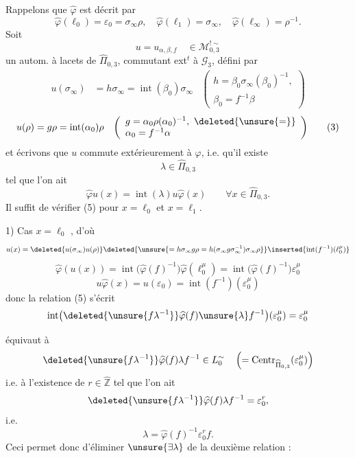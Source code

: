 Rappelons  que $\widehat\varphi$ est décrit par
\[
\widehat\varphi(\ell_0)=\varepsilon_0=\sigma_\infty\rho,\quad
\widehat\varphi(\ell_1)=\sigma_\infty,\quad
\widehat\varphi(\ell_\infty)=\rho^{-1}.
\tag{1}
\]
Soit
\[
u=u_{\alpha,\beta,f}\quad\in\mathcal M_{0,3}^{!\sim}
\]
un autom. à lacets de $\widehat\Pi_{0,3}$, commutant ext${}^{t}$ à $\mathcal G_3$, défini par
\[
\begin{aligned}
u(\sigma_\infty)&=h\sigma_\infty=\operatorname{int}(\beta_0)\sigma_\infty
&\left(\begin{array}{l}h=\beta_0\sigma_\infty(\beta_0)^{-1},\\\beta_0=f^{-1}\beta\end{array}\right)
\end{aligned}
\tag{2}
\]
\[
\begin{aligned}
u(\rho)&=g\rho=\operatorname{int}(\alpha_0)\rho
&\left(\begin{array}{l}g=\alpha_0\rho(\alpha_0)^{-1},\ \deleted{\unsure{=}}\\\alpha_0=f^{-1}\alpha\end{array}\right)
\end{aligned}
\tag{3}
\]
et écrivons que $u$ commute extérieurement à $\varphi$, i.e. qu'il existe \deleted{\unsure{$\lambda\in$}}
\[
\lambda\in\widehat\Pi_{0,3}
\tag{4}
\]
tel que l'on ait
\[
\widehat\varphi u(x)=\operatorname{int}(\lambda)u\widehat\varphi(x)
\qquad\forall x\in\widehat\Pi_{0,3}.
\tag{5}
\]
Il suffit de vérifier (5) pour $x=\ell_0$ et $x=\ell_1$.

1) Cas $x=\ell_0$ , d'où
\[
u(x)=\deleted{u(\sigma_\infty)u(\rho)}\deleted{\unsure{=h\sigma_\infty g\rho=h(\sigma_\infty g\sigma_\infty^{-1})\sigma_\infty\rho}}
\inserted{\operatorname{int}(f^{-1})(\ell_0^\mu)}
\]
\[
\widehat\varphi(u(x))=\operatorname{int}\bigl(\widehat\varphi(f)^{-1}\bigr)\widehat\varphi(\ell_0^\mu)=\operatorname{int}\bigl(\widehat\varphi(f)^{-1}\bigr)\varepsilon_0^\mu
\]
\[
u\widehat\varphi(x)=u(\varepsilon_0)=\operatorname{int}(f^{-1})(\varepsilon_0^\mu)
\]
donc la relation (5) s'écrit
\[
\operatorname{int}\bigl(\deleted{\unsure{f\lambda^{-1}}}\widehat\varphi(f)\unsure{\lambda}f^{-1}\bigr)(\varepsilon_0^\mu)=\varepsilon_0^\mu
\]

équivaut à
\[
\deleted{\unsure{f\lambda^{-1}}}\widehat\varphi(f)\lambda f^{-1}\in L_0^{\sim}\quad
\left(=\operatorname{Centr}_{\widehat\Pi_{0,3}}(\varepsilon_0^\mu)\right)
\]
i.e. à l'existence de $r\in\widehat{\mathbb Z}$ tel que l'on ait
\[
\deleted{\unsure{f\lambda^{-1}}}\widehat\varphi(f)\lambda f^{-1}=\varepsilon_0^r,
\]
i.e.
\[
\lambda=\widehat\varphi(f)^{-1}\varepsilon_0^r f.
\tag{6}
\]
Ceci permet donc d'éliminer $\unsure{\exists\lambda}$ de la deuxième relation :


